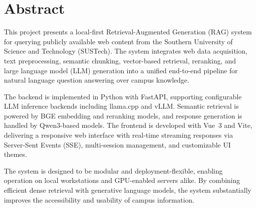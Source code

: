 \chapter*{Abstract}
This project presents a local-first Retrieval-Augmented Generation (RAG) system for querying publicly available web content from the Southern University of Science and Technology (SUSTech). The system integrates web data acquisition, text preprocessing, semantic chunking, vector-based retrieval, reranking, and large language model (LLM) generation into a unified end-to-end pipeline for natural language question answering over campus knowledge.

The backend is implemented in Python with FastAPI, supporting configurable LLM inference backends including llama.cpp and vLLM. Semantic retrieval is powered by BGE embedding and reranking models, and response generation is handled by Qwen3-based models. The frontend is developed with Vue~3 and Vite, delivering a responsive web interface with real-time streaming responses via Server-Sent Events (SSE), multi-session management, and customizable UI themes.

The system is designed to be modular and deployment-flexible, enabling operation on local workstations and GPU-enabled servers alike. By combining efficient dense retrieval with generative language models, the system substantially improves the accessibility and usability of campus information.